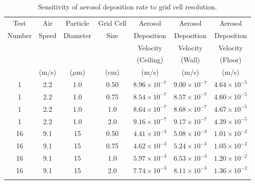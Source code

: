 \begin{table}[!ht]
\caption[Sensitivity of aerosol deposition rate to grid cell resolution]
{Sensitivity of aerosol deposition rate to grid cell resolution.}
\begin{tabular}{ccccccc}
\hline\noalign{\smallskip}
Test      &  Air     &  Particle  &  Grid Cell  &  Aerosol                &  Aerosol                &  Aerosol                \\
Number    &  Speed   &  Diameter  &  Size       &  Deposition             &  Deposition             &  Deposition             \\
          &          &            &             &  Velocity               &  Velocity               &  Velocity               \\
          &          &            &             &  (Ceiling)              &  (Wall)                 &  (Floor)                \\
          &  (m/s)   &  ($\mu$m)  &  (cm)       &  (m/s)                  &  (m/s)                  &  (m/s)                  \\
\noalign{\smallskip}\hline\noalign{\smallskip}
1         &  2.2     &  1.0       &  0.50       &  $8.96 \times 10^{-7}$  &  $9.00 \times 10^{-7}$  &  $4.64 \times 10^{-5}$  \\
1         &  2.2     &  1.0       &  0.75       &  $8.54 \times 10^{-7}$  &  $8.57 \times 10^{-7}$  &  $4.60 \times 10^{-5}$  \\
1         &  2.2     &  1.0       &  1.0        &  $8.64 \times 10^{-7}$  &  $8.68 \times 10^{-7}$  &  $4.67 \times 10^{-5}$  \\
1         &  2.2     &  1.0       &  2.0        &  $9.16 \times 10^{-7}$  &  $9.17 \times 10^{-7}$  &  $4.39 \times 10^{-5}$  \\
16        &  9.1     &  15        &  0.50       &  $4.41 \times 10^{-3}$  &  $5.08 \times 10^{-3}$  &  $1.01 \times 10^{-2}$  \\
16        &  9.1     &  15        &  0.75       &  $4.62 \times 10^{-3}$  &  $5.24 \times 10^{-3}$  &  $1.05 \times 10^{-2}$  \\
16        &  9.1     &  15        &  1.0        &  $5.97 \times 10^{-3}$  &  $6.53 \times 10^{-3}$  &  $1.20 \times 10^{-2}$  \\
16        &  9.1     &  15        &  2.0        &  $7.74 \times 10^{-3}$  &  $8.11 \times 10^{-3}$  &  $1.36 \times 10^{-2}$  \\
\noalign{\smallskip}\hline
\end{tabular}
\label{tab:Grid_Sensitivity}
\end{table}

